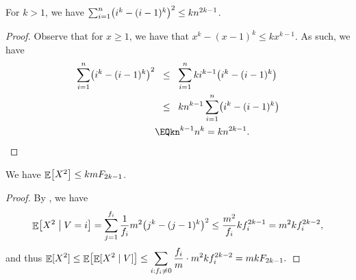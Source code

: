 \begin{lemma}
    For $k > 1$, we have
    $\sum_{i=1}^n \pth{ i^k - (i-1)^k}^2 \leq kn^{2k-1}$.
\end{lemma}
\begin{proof}
    Observe that for $x\geq 1$, we have that
    $x^k - (x-1)^k \leq kx^{k-1}$. As such, we have
    \begin{align*}
        \sum_{i=1}^n \pth{ i^k - (i-1)^k}^2%
        &\LEQ %
        \sum_{i=1}^n  ki^{k-1}\pth{ i^k - (i-1)^k}%
        \\&
        \LEQ %
        kn^{k-1} \sum_{i=1}^n \pth{ i^k - (i-1)^k}%
        \\&
        \EQ%
        kn^{k-1} n^{k}
        =%
        kn^{2k-1}.
    \end{align*}
\end{proof}


\begin{lemma}
    We have $\mathop{\mathbb{E}}\!\left[ {X^2} \right] \leq k m F_{2k-1}$.
\end{lemma}
\begin{proof}
    By , we have
    \begin{equation*}
        \ExCond{X^2}{V=i} =%
        \sum_{j=1}^{\frq_i}\frac{1}{\frq_i} m^2 \bigl( j^k - (j-1)^k
        \bigr)^2 \leq \frac{m^2}{\frq_i} k \frq_i^{2k-1}%
        =%
        m^2 k \frq_i^{2k-2},
    \end{equation*}
    and thus
    \begin{math}
        \ds%
        \Ex{\smash{X^2}}%
        \leq%
        \Ex{\bigl.\ExCond{\smash{X^2}}{V}\bigr.} %
        \leq%
        \sum_{i: \frq_i\neq 0} \frac{\frq_i}{m}\cdot m^2 k
        \frq_i^{2k-2} = mk \Frq_{2k-1}.
    \end{math}
\end{proof}


